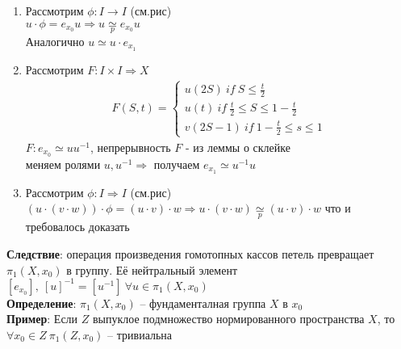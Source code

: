 	\begin{enumerate}
		\item 
		\begin{figure}[h]
		\end{figure}
		Рассмотрим $\phi: I\rightarrow I$ (см.рис)\\
		$u\cdot \phi = e_{x_0} u \Rightarrow u \underset{p}{\simeq} e_{x_0} u$\\
		Аналогично $u \simeq u\cdot e_{x_1}$
		\item 
		\begin{figure}[h]
		\end{figure}
		Рассмотрим $F: I\times I \Rightarrow X$\\
		\begin{gather*}
		F(S,t) = 
		\begin{cases}
		u(2S)\ if\ S \leq \frac{t}{2}\\
		u(t)\ if\ \frac{t}{2} \leq S \leq 1 - \frac{t}{2}\\
		v(2S-1)\ if\ 1 - \frac{t}{2} \leq s \leq 1
		\end{cases}
		\end{gather*}
		$F: e_{x_0} \simeq uu^{-1}$, непрерывность $F$ - из леммы о склейке\\
		меняем ролями $u,u^{-1} \Rightarrow$ получаем $e_{x_1} \simeq u^{-1}u$
		\item 
		\begin{figure}[h]
		\end{figure}
		Рассмотрим $\phi: I\Rightarrow I$ (см.рис)\\
		$(u\cdot (v\cdot w))\cdot \phi = (u\cdot v)\cdot w \Rightarrow u\cdot (v\cdot w) \underset{p}{\simeq} (u\cdot v)\cdot w$ что и требовалось доказать
	\end{enumerate}
	\textbf{Следствие}: операция произведения гомотопных кассов петель превращает ${\pi}_1 (X,x_0)$ в группу. Её нейтральный элемент $[e_{x_0}],\ [u]^{-1} = [u^{-1}]\ \forall u \in {\pi}_1 (X, x_0)$\\
	\textbf{Определение}: ${\pi}_1 (X,x_0) $ -- фундаменталная группа $X$ в $x_0$\\
	\textbf{Пример}: Если $Z$ выпуклое подмножество нормированного пространства $X$, то $\forall x_0 \in Z\ {\pi}_1 (Z,x_0)$ -- тривиальна
	
	


\newpage
